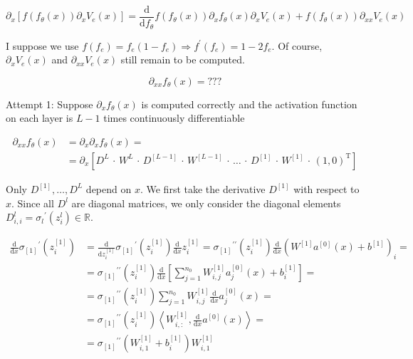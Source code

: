 \begin{equation*}
    \partial_x [f(f_{\theta}(x)) \partial_x V_e(x)] = \frac{\mathrm{d}}{\mathrm{d} f_{\theta}} f(f_{\theta}(x)) \partial_x f_{\theta}(x) \partial_x V_e(x) + f(f_{\theta}(x)) \partial_{xx} V_e(x)
\end{equation*}

I suppose we use $f(f_e) = f_e(1-f_e) \Rightarrow f^{\prime}(f_e) = 1 - 2 f_e$. Of course, $\partial_x V_e(x)$ and $\partial_{xx} V_e(x)$ still remain to be computed. 



\begin{equation*}
    \partial_{x x} f_{\theta}(x) = ???
\end{equation*}

Attempt 1: Suppose $\partial_x f_{\theta}(x)$ is computed correctly and the activation function on each layer is $L-1$ times continuously differentiable

\begin{align*}
    \partial_{x x} f_{\theta}(x) & = \partial_{x} \partial_{x} f_{\theta}(x) = \\
    & = \partial_{x} [D^{L} \, \cdot \, W^{L} \, \cdot \, D^{[L-1]} \, \cdot \, W^{[L-1]} \, \cdot \, \ldots \, \cdot \, D^{[1]} \, \cdot \, W^{[1]} \, \cdot \, (1, 0)^{\mathrm{T}}]
\end{align*}

Only $D^{[1]}, \ldots, D^{L}$ depend on $x$. We first take the derivative $D^{[1]}$ with respect to $x$. Since all $D^{l}$ are diagonal matrices, we only consider the diagonal elements $D_{i, i}^{l} = {\sigma_{l}}^{\prime} (z_{i}^{l}) \in \mathbb{R}$.  

\begin{align*}
    \frac{\mathrm{d}}{\mathrm{d} x} {\sigma_{[1]}}^{\prime} (z_{i}^{[1]}) & = \frac{\mathrm{d}}{\mathrm{d} z_{i}^{[1]}} {\sigma_{[1]}}^{\prime} (z_{i}^{[1]}) \frac{\mathrm{d}}{\mathrm{d} x} z_{i}^{[1]} = {\sigma_{[1]}}^{\prime \prime} (z_{i}^{[1]}) \frac{\mathrm{d}}{\mathrm{d} x} (W^{[1]} a^{[0]}(x) + b^{[1]})_i = \\
    & = {\sigma_{[1]}}^{\prime \prime} (z_{i}^{[1]}) \frac{\mathrm{d}}{\mathrm{d} x} \left[ \sum^{n_0}_{j=1} W^{[1]}_{i,j} a^{[0]}_{j}(x) + b^{[1]}_i \right] = \\
    & = {\sigma_{[1]}}^{\prime \prime} (z_{i}^{[1]}) \sum^{n_0}_{j=1} W^{[1]}_{i,j} \frac{\mathrm{d}}{\mathrm{d} x} a^{[0]}_{j}(x) = \\
    & = {\sigma_{[1]}}^{\prime \prime} (z_{i}^{[1]}) \left\langle W^{[1]}_{i, \colon}, \frac{\mathrm{d}}{\mathrm{d} x} a^{[0]}(x)  \right\rangle = \\
    & = {\sigma_{[1]}}^{\prime \prime} (W^{[1]}_{i, 1} + b^{[1]}_i) W^{[1]}_{i, 1}
\end{align*}

